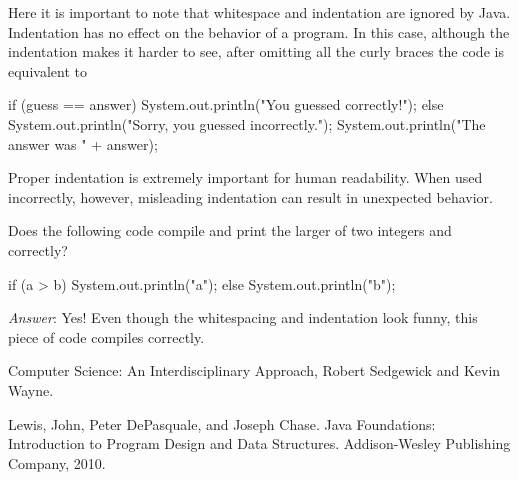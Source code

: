 Here it is important to note that whitespace and indentation are ignored by Java. Indentation has no effect on the behavior of a program. In this case, although the indentation makes it harder to see, after omitting all the curly braces the code is equivalent to 

\begin{code}
if (guess == answer)
{
    System.out.println("You guessed correctly!");
} 
else 
{
    System.out.println("Sorry, you guessed incorrectly.");
}
System.out.println("The answer was " + answer); 
\end{code}

Proper indentation is extremely important for human readability. When used incorrectly, however, misleading indentation can result in unexpected behavior.

\begin{example}
Does the following code compile and print the larger of two integers  and  correctly?

\begin{code}
if (a > b)      System.out.println("a");
else 
{
System.out.println("b");
}
\end{code}

\emph{Answer}: Yes! Even though the whitespacing and indentation look funny, this piece of code compiles correctly.
\end{example}

Computer Science: An Interdisciplinary Approach, Robert Sedgewick and Kevin Wayne.

Lewis, John, Peter DePasquale, and Joseph Chase. Java Foundations: Introduction to Program Design and Data Structures. Addison-Wesley Publishing Company, 2010.